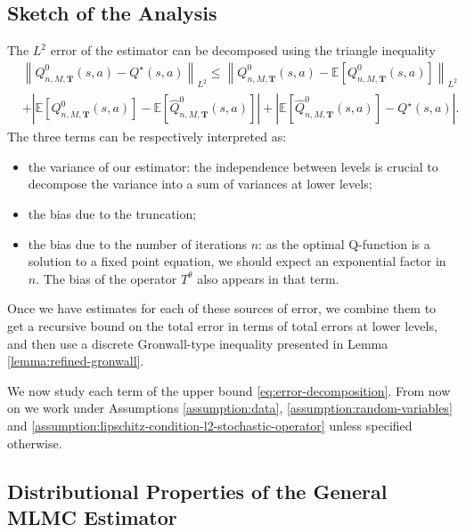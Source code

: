 \documentclass[11pt]{article}
\numberwithin{equation}{section}
\theoremstyle{definition}
\theoremstyle{remark}
\begin{document}
\subsection{Sketch of the Analysis}
The $L^2$ error of the estimator can be decomposed using the triangle inequality
\begin{equation}
    \label{eq:error-decomposition}
    \begin{aligned}
         & \left\| Q ^{0}_{n,M,\mathbf T}(s,a) - Q ^{\star}(s,a) \right\| _{L^2}  \leq \left\| Q ^{0}_{n,M,\mathbf T}(s,a) - \mathbb E \left[ Q ^{0} _{n,M,\mathbf T}(s,a) \right] \right\|_{L^2} \\
         & + \left| \mathbb E \left[ Q ^{0}_{n,M, \mathbf T}(s,a) \right] - \mathbb E \left[ \hat{Q} ^{0}_{n,M, \mathbf T} (s,a) \right] \right|
        + \left| \mathbb E \left[ \hat{Q} ^{0}_{n,M,\mathbf T}(s,a) \right]  - Q ^{\star}(s,a) \right|.
    \end{aligned}
\end{equation}
The three terms can be respectively interpreted as:
\begin{itemize}
    \item the variance of our estimator: the independence between levels is crucial to decompose the variance into a sum of variances at lower levels;
    \item the bias due to the truncation;
    \item the bias due to the number of iterations $n$: as the optimal Q-function is a solution to a fixed point equation, we should expect an exponential factor in $n$. The bias of the operator $T^\theta$ also appears in that term.
\end{itemize}
Once we have estimates for each of these sources of error, we combine them to get a recursive bound on the total error in terms of total errors at lower levels, and then use a discrete Gronwall-type inequality presented in Lemma \ref{lemma:refined-gronwall}.

We now study each term of the upper bound \eqref{eq:error-decomposition}. From now on we work under Assumptions \ref{assumption:data}, \ref{assumption:random-variables} and \ref{assumption:lipschitz-condition-l2-stochastic-operator} unless specified otherwise.

\subsection{Distributional Properties of the General MLMC Estimator}
\label{subsection:technal-lemmas}
\end{document}
